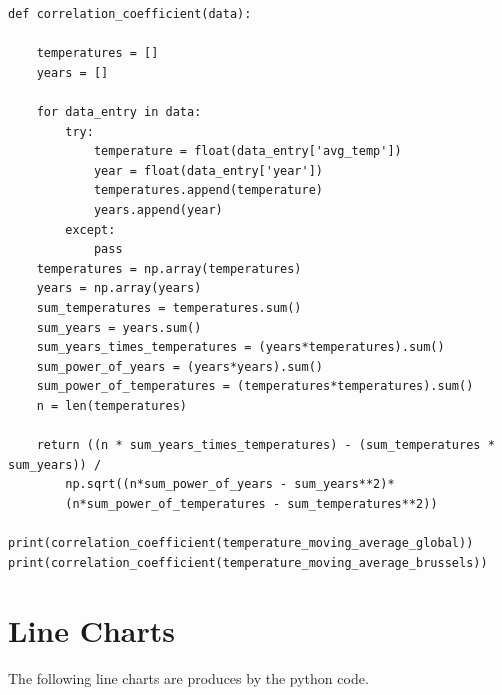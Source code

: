 \documentclass{article}
\begin{document}
\begin{lstlisting}
def correlation_coefficient(data):

	temperatures = []
	years = []

	for data_entry in data:
		try:
			temperature = float(data_entry['avg_temp'])
			year = float(data_entry['year'])
			temperatures.append(temperature)
			years.append(year)
		except:
			pass
	temperatures = np.array(temperatures)
	years = np.array(years)
	sum_temperatures = temperatures.sum()
	sum_years = years.sum()
	sum_years_times_temperatures = (years*temperatures).sum()
	sum_power_of_years = (years*years).sum()
	sum_power_of_temperatures = (temperatures*temperatures).sum()
	n = len(temperatures)

	return ((n * sum_years_times_temperatures) - (sum_temperatures * sum_years)) / 
		np.sqrt((n*sum_power_of_years - sum_years**2)*
		(n*sum_power_of_temperatures - sum_temperatures**2))

print(correlation_coefficient(temperature_moving_average_global))
print(correlation_coefficient(temperature_moving_average_brussels))

\end{lstlisting}

\section{Line Charts}
The following line charts are produces by the python code.
\end{document}
